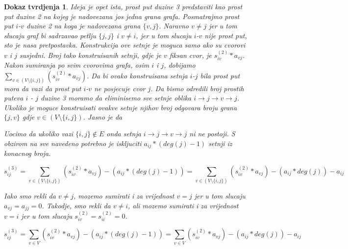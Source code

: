 \documentclass[11pt]{article}
\newtheorem*{custom_proof}{Dokaz tvrdjenja}
\begin{document}
			\begin{custom_proof}
			Ideja je opet ista, prost put duzine 3 predstaviti kao prost put duzine 2 na kojeg je nadovezana jos jedna grana grafa. Posmatrajmo prost put $i$-$v$ duzine 2 na koga je nadovezana grana $\{v,j\}$. 
			Naravno $v \neq j$ jer u tom slucaju graf bi sadrzavao petlju $\{j,j\}$ i $v \neq i$, jer u tom slucaju $i$-$v$ nije prost put, sto je nasa pretpostavka. 
			Konstrukcija ove setnje je moguca samo ako su cvorovi $v$ i $j$ susjedni. Broj tako konstruisanih setnji, gdje je $v$ fiksan cvor, je $s_{iv}^{(2)} * a_{vj}$.
			Nakon sumiranja po svim cvorovima grafa, osim $i$ i $j$, dobijamo $\sum_{v \in (V \setminus \{i,j\})} (s_{iv}^{(2)} * a_{vj}) $.
			Da bi ovako konstruisana setnja $i$-$j$ bila prost put mora da vazi 	da prost put $i$-$v$ ne posjecuje cvor $j$. 
			Da bismo odredili broj prostih puteva $i$ - $j$ duzine 3 moramo da eliminisemo sve setnje oblika $i \rightarrow j \rightarrow v \rightarrow j$. 
			Ukoliko je moguce konstruisati ovakve setnje njihov broj odgovara broju grana $\{j,v\}$ gdje $v \in (V \setminus \{i,j\})$. Jasno je da 
			\[
			\]
		
			Uocimo da ukoliko vazi $\{i,j\} \notin E$ onda setnja $i \rightarrow j \rightarrow v \rightarrow j$ ni ne postoji.
			S obzirom na sve navedeno potrebno je iskljuciti $a_{ij} * (deg(j) - 1)$ setnji iz konacnog broja.
		
			\[
			s_{ij}^{(3)} =  \sum_{v \in (V \setminus \{i,j\})} (s_{iv}^{(2)} * a_{vj}) - (a_{ij} * (deg(j)  - 1))
				       = \sum_{v \in (V \setminus \{i,j\})} (s_{iv}^{(2)} * a_{vj}) - (a_{ij} * deg(j)) - a_{ij}
			\] 
		
			Iako smo rekli da $v \neq j$, mozemo sumirati i za vrijednost $v=j$ jer u tom slucaju $a_{vj} = a_{jj} = 0$.
			Takodje, smo rekli da $v \neq i$, ali mozemo sumirati i za vrijednost $v=i$ jer u tom slucaju $s_{iv}^{(2)} = s_{ii}^{(2)} = 0$.
			
			\[
			s_{ij}^{(3)} =  \sum_{v \in V} (s_{iv}^{(2)} * a_{vj}) - (a_{ij} * (deg(j)  - 1))
				       = \sum_{v \in V} (s_{iv}^{(2)} * a_{vj}) - (a_{ij} * deg(j)) - a_{ij}
			\] 
		 

\end{custom_proof}
\end{document}
